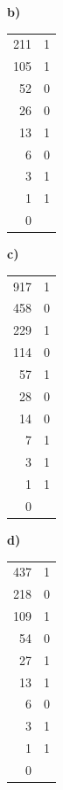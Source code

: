 \begin{esercizio}[8]
\begin{solution}
{\begin{minipage}[t]{0.24\linewidth}
  \textbf{b)}\\[2pt]
  {\small\renewcommand{\arraystretch}{1.0}\begin{tabular}{r|l}
    211 & 1\\
    105 & 1\\
    52 & 0\\
    26 & 0\\
    13 & 1\\
    6 & 0\\
    3 & 1\\
    1 & 1\\
    0 & \\
  \end{tabular}}
  \end{minipage}\hfill
  \begin{minipage}[t]{0.24\linewidth}
  \textbf{c)}\\[2pt]
  {\small\renewcommand{\arraystretch}{1.0}\begin{tabular}{r|l}
    917 & 1\\
    458 & 0\\
    229 & 1\\
    114 & 0\\
    57 & 1\\
    28 & 0\\
    14 & 0\\
    7 & 1\\
    3 & 1\\
    1 & 1\\
    0 & \\
  \end{tabular}}
  \end{minipage}\hfill
  \begin{minipage}[t]{0.24\linewidth}
  \textbf{d)}\\[2pt]
  {\small\renewcommand{\arraystretch}{1.0}\begin{tabular}{r|l}
    437 & 1\\
    218 & 0\\
    109 & 1\\
    54 & 0\\
    27 & 1\\
    13 & 1\\
    6 & 0\\
    3 & 1\\
    1 & 1\\
    0 & \\
  \end{tabular}}
  \end{minipage}\\[6pt]
}
\end{solution}
\end{esercizio}
